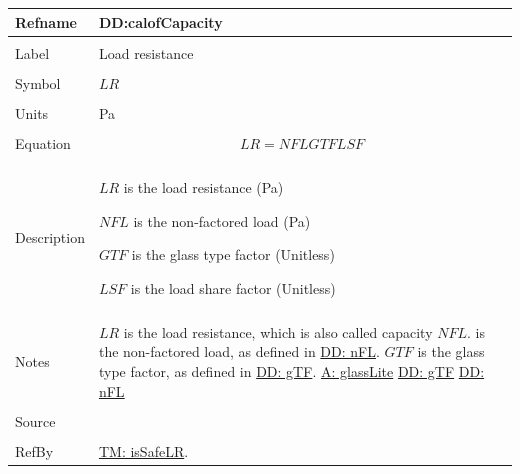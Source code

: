 \documentclass[12pt]{article}
\begin{document}
\noindent \begin{minipage}{\textwidth}
\begin{tabular}{p{} p{}}
\toprule \textbf{Refname} & \textbf{DD:calofCapacity}
\label{DD:calofCapacity}
\\ \midrule \\
Label & Load resistance
\\ \midrule \\
Symbol & $LR$
\\ \midrule \\
Units & Pa
\\ \midrule \\
Equation & \begin{displaymath}
           LR=NFL GTF LSF
           \end{displaymath}
\\ \midrule \\
Description & \begin{symbDescription}
              \item{$LR$ is the load resistance (Pa)}
              \item{$NFL$ is the non-factored load (Pa)}
              \item{$GTF$ is the glass type factor (Unitless)}
              \item{$LSF$ is the load share factor (Unitless)}
              \end{symbDescription}
\\ \midrule \\
Notes & $LR$ is the load resistance, which is also called capacity $NFL$. is the non-factored load, as defined in \hyperref[DD:nFL]{DD: nFL}. $GTF$ is the glass type factor, as defined in \hyperref[DD:gTF]{DD: gTF}.
        \hyperref[assumpGL]{A: glassLite}
        \hyperref[DD:gTF]{DD: gTF}
        \hyperref[DD:nFL]{DD: nFL}
\\ \midrule \\
Source & \cite{astm2009}
\\ \midrule \\
RefBy & \hyperref[TM:isSafeLR]{TM: isSafeLR}.
\\ \bottomrule \end{tabular}
\end{minipage}
\par~
\end{document}

